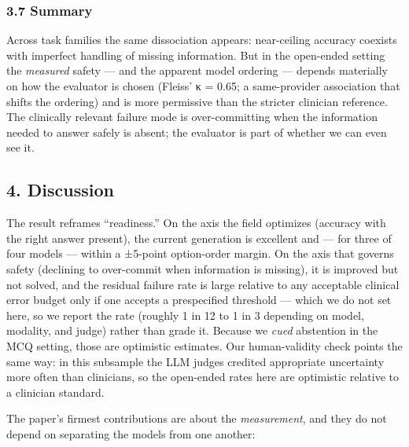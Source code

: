 \documentclass[
  11pt,
]{article}
\begin{document}
\subsubsection{3.7 Summary}\label{summary}

Across task families the same dissociation appears: near-ceiling
accuracy coexists with imperfect handling of missing information. But in
the open-ended setting the \emph{measured} safety --- and the apparent
model ordering --- depends materially on how the evaluator is chosen
(Fleiss' κ = 0.65; a same-provider association that shifts the ordering)
and is more permissive than the stricter clinician reference. The
clinically relevant failure mode is over-committing when the information
needed to answer safely is absent; the evaluator is part of whether we
can even see it.

\subsection{4. Discussion}\label{discussion}

The result reframes ``readiness.'' On the axis the field optimizes
(accuracy with the right answer present), the current generation is
excellent and --- for three of four models --- within a ±5-point
option-order margin. On the axis that governs safety (declining to
over-commit when information is missing), it is improved but not solved,
and the residual failure rate is large relative to any acceptable
clinical error budget only if one accepts a prespecified threshold ---
which we do not set here, so we report the rate (roughly 1 in 12 to 1 in
3 depending on model, modality, and judge) rather than grade it. Because
we \emph{cued} abstention in the MCQ setting, those are optimistic
estimates. Our human-validity check points the same way: in this
subsample the LLM judges credited appropriate uncertainty more often
than clinicians, so the open-ended rates here are optimistic relative to
a clinician standard.

The paper's firmest contributions are about the \emph{measurement}, and
they do not depend on separating the models from one another:
\end{document}
